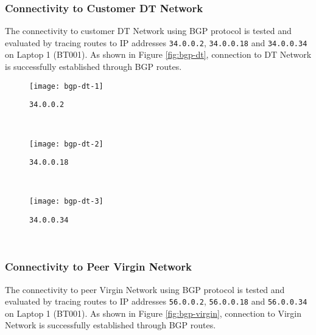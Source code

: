 \clearpage


\subsubsection{Connectivity to Customer DT Network}
The connectivity to customer DT Network using BGP protocol is tested and evaluated by tracing routes to IP addresses \texttt{34.0.0.2}, \texttt{34.0.0.18} and \texttt{34.0.0.34} on Laptop 1 (BT001). As shown in Figure \ref{fig:bgp-dt}, connection to DT Network is successfully established through BGP routes.

\begin{figure*}[ht!]
    \centering
    \begin{subfigure}[b]{\textwidth}
        \centering
        \texttt{[image: bgp-dt-1]}
        \caption{\texttt{34.0.0.2}}
    \end{subfigure}
    ~
    \begin{subfigure}[b]{\textwidth}
        \centering
        \texttt{[image: bgp-dt-2]}
        \caption{\texttt{34.0.0.18}}
    \end{subfigure}
    ~
    \begin{subfigure}[b]{\textwidth}
        \centering
        \texttt{[image: bgp-dt-3]}
        \caption{\texttt{34.0.0.34}}
    \end{subfigure}
    ~
    \caption{Tracing IPv4 Routes to DT Network on Laptop 1 (BT001) using \texttt{traceroute}.}
    \label{fig:bgp-dt}
\end{figure*}



\clearpage

\subsubsection{Connectivity to Peer Virgin Network}
The connectivity to peer Virgin Network using BGP protocol is tested and evaluated by tracing routes to IP addresses \texttt{56.0.0.2}, \texttt{56.0.0.18} and \texttt{56.0.0.34} on Laptop 1 (BT001). As shown in Figure \ref{fig:bgp-virgin}, connection to Virgin Network is successfully established through BGP routes.

